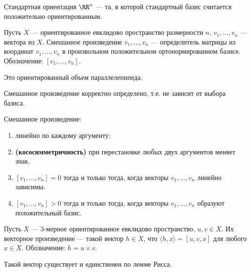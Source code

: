 \documentclass[12pt,a4paper]{article}
\begin{document}
    \begin{example}
        Стандартная ориентация $\RR^n$ --- та, в которой стандартный базис считается положительно ориентированным.
    \end{example}

    \begin{definition}
        Пусть $X$ --- ориентированное евклидово пространство размерности $n$, $v_1, \dots, v_n$ --- вектора из $X$. Смешанное произведение $v_1, \dots, v_n$ --- определитель матрицы из координат $v_1, \dots,v_n$ в произвольном положительном ортонормированном базисе. Обозначение: $[v_1, \dots, v_n]$.
    \end{definition}

    \begin{remark}
        Это ориентированный объем параллелепипеда.
    \end{remark}

    \begin{theorem}
        Смешанное произведение корректно определено, т.е. не зависит от выбора базиса.
    \end{theorem}

    \begin{lemma}
        Смешанное произведение:
        \begin{enumerate}
            \item линейно по каждому аргументу;
            \item \textbf{(кососимметричность)} при перестановке любых двух аргументов меняет знак.
            \item $[v_1, \dots, v_n] = 0$ тогда и только тогда, когда векторы $v_1, \dots, v_n$ линейно зависимы.
            \item $[v_1, \dots, v_n] > 0$ тогда и только тогда, когда векторы $v_1, \dots, v_n$ образуют положительный базис.
        \end{enumerate}
    \end{lemma}

    \begin{definition}
        Пусть $X$ --- 3-мерное ориентированное евклидово пространство, $u, v \in X$. Их векторное произведение --- такой вектор $h \in X$, что $\langle h, x \rangle = [u, v, x]$ для любого $x \in X$. Обозначение: $h = u \times v$.
    \end{definition}

    \begin{remark}
        Такой вектор существует и единственен по лемме Рисса.
    \end{remark}
\end{document}
